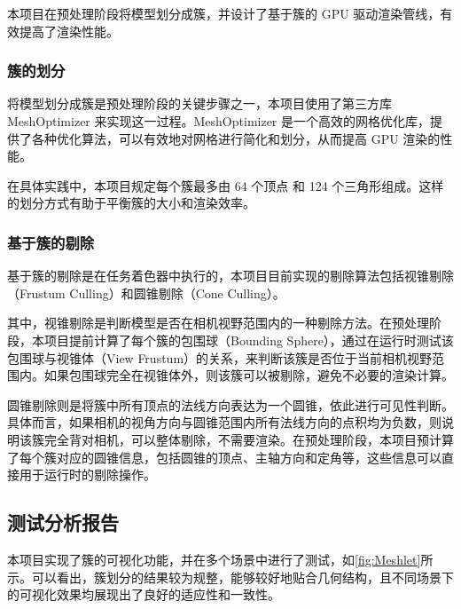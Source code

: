 本项目在预处理阶段将模型划分成簇，并设计了基于簇的 GPU 驱动渲染管线，有效提高了渲染性能。

\subsubsection{簇的划分} \label{subsubsec:cluster division}

将模型划分成簇是预处理阶段的关键步骤之一，本项目使用了第三方库 MeshOptimizer 来实现这一过程\cite{meshoptimizer}。MeshOptimizer 是一个高效的网格优化库，提供了各种优化算法，可以有效地对网格进行简化和划分，从而提高 GPU 渲染的性能。

在具体实践中，本项目规定每个簇最多由 64 个顶点 和 124 个三角形组成。这样的划分方式有助于平衡簇的大小和渲染效率\cite{Kubisch2018}。

\subsubsection{基于簇的剔除} \label{subsubsec:cluster culling}

基于簇的剔除是在任务着色器中执行的，本项目目前实现的剔除算法包括视锥剔除（Frustum Culling）和圆锥剔除（Cone Culling）。

其中，视锥剔除是判断模型是否在相机视野范围内的一种剔除方法。在预处理阶段，本项目提前计算了每个簇的包围球（Bounding Sphere），通过在运行时测试该包围球与视锥体（View Frustum）的关系，来判断该簇是否位于当前相机视野范围内。如果包围球完全在视锥体外，则该簇可以被剔除，避免不必要的渲染计算。

圆锥剔除则是将簇中所有顶点的法线方向表达为一个圆锥，依此进行可见性判断。具体而言，如果相机的视角方向与圆锥范围内所有法线方向的点积均为负数，则说明该簇完全背对相机，可以整体剔除，不需要渲染。在预处理阶段，本项目预计算了每个簇对应的圆锥信息，包括圆锥的顶点、主轴方向和定角等，这些信息可以直接用于运行时的剔除操作。

\subsection{测试分析报告}

本项目实现了簇的可视化功能，并在多个场景中进行了测试，如\autoref{fig:Meshlet}所示。可以看出，簇划分的结果较为规整，能够较好地贴合几何结构，且不同场景下的可视化效果均展现出了良好的适应性和一致性。


